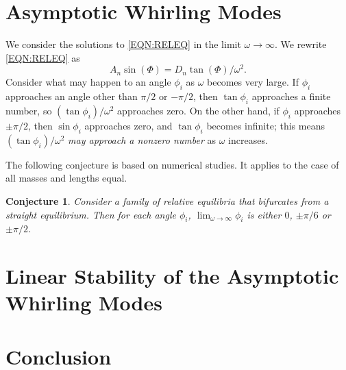 \documentclass[11pt]{amsart}
\newtheorem{conj}{Conjecture}
\begin{document}
\section{Asymptotic Whirling Modes}
We consider the solutions to \eqref{EQN:RELEQ} in the limit $\omega\rightarrow\infty$.
We rewrite \eqref{EQN:RELEQ} as
\begin{equation}
    A_n \sin(\Phi) = D_n\tan(\Phi)/\omega^2.
    \label{EQN:RELEQ2}
\end{equation}
Consider what may happen to an angle $\phi_i$ as $\omega$ becomes very large.
If $\phi_i$ approaches an angle other than $\pi/2$ or $-\pi/2$, then
$\tan\phi_i$ approaches a finite number, so $(\tan\phi_i)/\omega^2$ approaches
zero.  On the other hand, if $\phi_i$ approaches $\pm\pi/2$,
then $\sin\phi_i$ approaches zero, and
$\tan\phi_i$ becomes infinite; this means $(\tan\phi_i)/\omega^2$
\emph{may approach a nonzero number} as $\omega$ increases.

The following conjecture is based on numerical studies.
It applies to the case of all masses and lengths equal.
\begin{conj}
Consider a family of relative equilibria that bifurcates from
a straight equilibrium.  Then for each angle $\phi_i$,
$\lim_{\omega\rightarrow\infty} \phi_i$ is either $0$, $\pm \pi/6$ or $\pm \pi/2$.
\end{conj}

\section{Linear Stability of the Asymptotic Whirling Modes}

\section{Conclusion}
\end{document}
